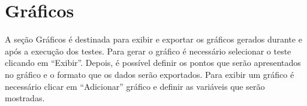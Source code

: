 
\chapter{Gráficos}%
\label{chapter:graficos}

A seção Gráficos é destinada para exibir e exportar os gráficos gerados durante
e após a execução dos testes. Para gerar o gráfico é necessário selecionar o
teste clicando em “Exibir”. Depois, é possível definir os pontos que serão
apresentados no gráfico e o formato que os dados serão exportados. Para exibir
um gráfico é necessário clicar em “Adicionar” gráfico e definir as variáveis que
serão mostradas.
